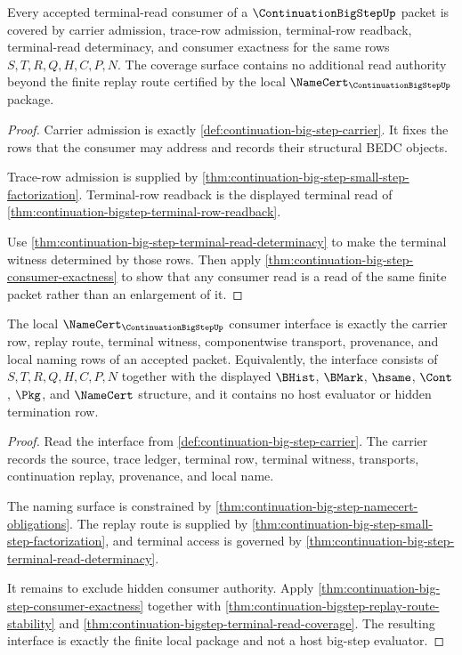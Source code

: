 \begin{theorem}
\label{thm:continuation-bigstep-terminal-read-coverage}
Every accepted terminal-read consumer of a $\ContinuationBigStepUp$ packet is covered by carrier admission, trace-row admission, terminal-row readback, terminal-read determinacy, and consumer exactness for the same rows $S,T,R,Q,H,C,P,N$. The coverage surface contains no additional read authority beyond the finite replay route certified by the local $\NameCert_{\ContinuationBigStepUp}$ package.
\end{theorem}
\begin{proof}
Carrier admission is exactly \autoref{def:continuation-big-step-carrier}. It fixes the rows that the consumer may address and records their structural BEDC objects.

Trace-row admission is supplied by \autoref{thm:continuation-big-step-small-step-factorization}. Terminal-row readback is the displayed terminal read of \autoref{thm:continuation-bigstep-terminal-row-readback}.

Use \autoref{thm:continuation-big-step-terminal-read-determinacy} to make the terminal witness determined by those rows. Then apply \autoref{thm:continuation-big-step-consumer-exactness} to show that any consumer read is a read of the same finite packet rather than an enlargement of it.
\end{proof}

\begin{theorem}
\label{thm:continuation-bigstep-namecert-consumer-interface}
The local $\NameCert_{\ContinuationBigStepUp}$ consumer interface is exactly the carrier row, replay route, terminal witness, componentwise transport, provenance, and local naming rows of an accepted packet. Equivalently, the interface consists of $S,T,R,Q,H,C,P,N$ together with the displayed $\BHist$, $\BMark$, $\hsame$, $\Cont$, $\Pkg$, and $\NameCert$ structure, and it contains no host evaluator or hidden termination row.
\end{theorem}
\begin{proof}
Read the interface from \autoref{def:continuation-big-step-carrier}. The carrier records the source, trace ledger, terminal row, terminal witness, transports, continuation replay, provenance, and local name.

The naming surface is constrained by \autoref{thm:continuation-big-step-namecert-obligations}. The replay route is supplied by \autoref{thm:continuation-big-step-small-step-factorization}, and terminal access is governed by \autoref{thm:continuation-big-step-terminal-read-determinacy}.

It remains to exclude hidden consumer authority. Apply \autoref{thm:continuation-big-step-consumer-exactness} together with \autoref{thm:continuation-bigstep-replay-route-stability} and \autoref{thm:continuation-bigstep-terminal-read-coverage}. The resulting interface is exactly the finite local package and not a host big-step evaluator.
\end{proof}

